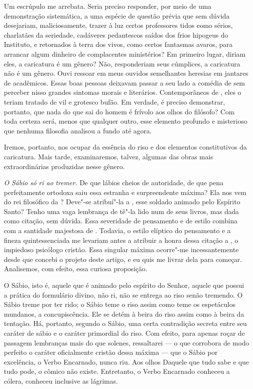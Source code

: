 Um escrúpulo me arrebata. Seria preciso responder, por meio de uma
demonstração sistemática, a uma espécie de questão prévia que sem
dúvida desejariam, maliciosamente, trazer à luz certos professores
tidos como sérios, charlatães da seriedade, cadáveres pedantescos
saídos dos frios hipogeus do Instituto, e retornados à terra dos vivos,
como certos fantasmas avaros, para arrancar algum dinheiro de
complacentes ministérios? Em primeiro lugar, diriam eles, a caricatura
é um gênero? Não, responderiam seus cúmplices, a caricatura não é um
gênero. Ouvi ressoar em meus ouvidos semelhantes heresias em jantares
de acadêmicos. Essas boas pessoas deixavam passar a seu lado a comédia
de  sem perceber nisso grandes sintomas morais e
literários. Contemporâneos de , eles o teriam tratado de vil e
grotesco bufão. Em verdade, é preciso demonstrar, portanto, que nada do
que sai do homem é frívolo aos olhos do filósofo? Com toda certeza
será, menos que qualquer outro, esse elemento profundo e misterioso que
nenhuma filosofia analisou a fundo até agora.

Iremos, portanto, nos ocupar da essência do riso e dos elementos
constitutivos da caricatura. Mais tarde, examinaremos, talvez, algumas
das obras mais extraordinárias produzidas nesse gênero.

\sectionitem

\textit{O Sábio só ri ao tremer. }De que lábios cheios de autoridade, de
que pena perfeitamente ortodoxa saiu essa estranha e surpreendente
máxima? Ela nos vem do rei filosófico da ? Deve"-se atribuí"-la a
, esse soldado animado pelo Espírito Santo? Tenho uma
vaga lembrança de tê"-la lido num de seus livros, mas dada como citação,
sem dúvida. Essa severidade de pensamento e de estilo combina com a
santidade majestosa de . Todavia, o estilo elíptico do
pensamento e a fineza quintessenciada me levariam antes a atribuir a
honra dessa citação a , o impiedoso psicólogo cristão. Essa
singular máxima ocorre"-me incessantemente desde que concebi o projeto
deste artigo, e eu quis me livrar dela para começar. Analisemos, com
efeito, essa curiosa proposição.

O Sábio, isto é, aquele que é animado pelo espírito do Senhor, aquele
que possui a prática do formulário divino, não ri, não se entrega ao
riso senão tremendo. O Sábio treme por ter rido; o Sábio teme o riso
assim como teme os espetáculos mundanos, a concupiscência. Ele se detém
à beira do riso assim como à beira da tentação. Há, portanto, segundo o
Sábio, uma certa contradição secreta entre seu caráter de sábio e o
caráter primordial do riso. Com efeito, para apenas roçar de passagem
lembranças mais do que solenes, ressaltarei --- o que corrobora de modo
perfeito o caráter oficialmente cristão dessa máxima --- que o Sábio por
excelência, o Verbo Encarnado, nunca riu. Aos olhos Daquele que tudo
sabe e que tudo pode, o cômico não existe. Entretanto, o Verbo
Encarnado conheceu a cólera, conheceu inclusive as lágrimas.

